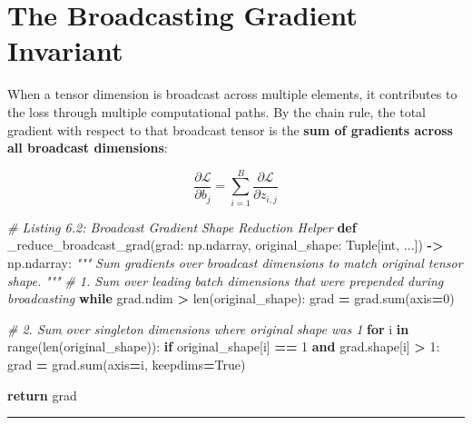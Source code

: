 \documentclass[
  letterpaper,
]{scrbook}
\newenvironment{Shaded}{\begin{snugshade}}{\end{snugshade}}
\newcommand{\BuiltInTok}[1]{#1}
\newcommand{\CommentTok}[1]{\textcolor[rgb]{0.56,0.35,0.01}{\textit{#1}}}
\newcommand{\ControlFlowTok}[1]{\textcolor[rgb]{0.13,0.29,0.53}{\textbf{#1}}}
\newcommand{\DecValTok}[1]{\textcolor[rgb]{0.00,0.00,0.81}{#1}}
\newcommand{\KeywordTok}[1]{\textcolor[rgb]{0.13,0.29,0.53}{\textbf{#1}}}
\newcommand{\NormalTok}[1]{#1}
\newcommand{\OperatorTok}[1]{\textcolor[rgb]{0.81,0.36,0.00}{\textbf{#1}}}
\newcommand{\VariableTok}[1]{\textcolor[rgb]{0.00,0.00,0.00}{#1}}
\begin{document}
\section{The Broadcasting Gradient
Invariant}\label{the-broadcasting-gradient-invariant}

When a tensor dimension is broadcast across multiple elements, it
contributes to the loss through multiple computational paths. By the
chain rule, the total gradient with respect to that broadcast tensor is
the \textbf{sum of gradients across all broadcast dimensions}:

\[\frac{\partial \mathcal{L}}{\partial b_j} = \sum_{i=1}^B \frac{\partial \mathcal{L}}{\partial z_{i, j}}\]

\begin{Shaded}
\begin{Highlighting}[]
\CommentTok{\# Listing 6.2: Broadcast Gradient Shape Reduction Helper}
\KeywordTok{def}\NormalTok{ \_reduce\_broadcast\_grad(grad: np.ndarray, original\_shape: Tuple[}\BuiltInTok{int}\NormalTok{, ...]) }\OperatorTok{{-}\textgreater{}}\NormalTok{ np.ndarray:}
    \CommentTok{"""}
\CommentTok{    Sum gradients over broadcast dimensions to match original tensor shape.}
\CommentTok{    """}
    \CommentTok{\# 1. Sum over leading batch dimensions that were prepended during broadcasting}
    \ControlFlowTok{while}\NormalTok{ grad.ndim }\OperatorTok{\textgreater{}} \BuiltInTok{len}\NormalTok{(original\_shape):}
\NormalTok{        grad }\OperatorTok{=}\NormalTok{ grad.}\BuiltInTok{sum}\NormalTok{(axis}\OperatorTok{=}\DecValTok{0}\NormalTok{)}

    \CommentTok{\# 2. Sum over singleton dimensions where original shape was 1}
    \ControlFlowTok{for}\NormalTok{ i }\KeywordTok{in} \BuiltInTok{range}\NormalTok{(}\BuiltInTok{len}\NormalTok{(original\_shape)):}
        \ControlFlowTok{if}\NormalTok{ original\_shape[i] }\OperatorTok{==} \DecValTok{1} \KeywordTok{and}\NormalTok{ grad.shape[i] }\OperatorTok{\textgreater{}} \DecValTok{1}\NormalTok{:}
\NormalTok{            grad }\OperatorTok{=}\NormalTok{ grad.}\BuiltInTok{sum}\NormalTok{(axis}\OperatorTok{=}\NormalTok{i, keepdims}\OperatorTok{=}\VariableTok{True}\NormalTok{)}

    \ControlFlowTok{return}\NormalTok{ grad}
\end{Highlighting}
\end{Shaded}

\begin{center}\rule{0.5\linewidth}{0.5pt}\end{center}
\end{document}
